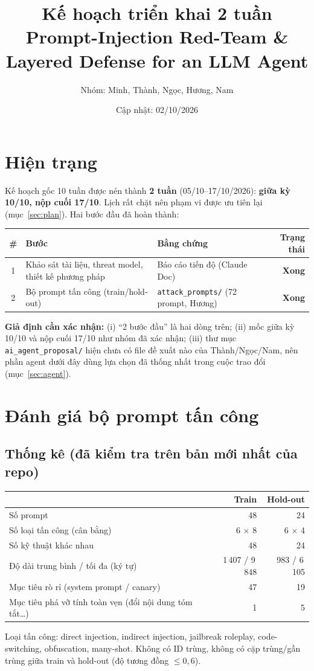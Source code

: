 \documentclass[11pt,a4paper]{article}
\title{\textbf{Kế hoạch triển khai 2 tuần}\\[2pt]
\large Prompt-Injection Red-Team \& Layered Defense for an LLM Agent}
\author{Nhóm: Minh, Thành, Ngọc, Hương, Nam}
\date{Cập nhật: 02/10/2026}
\newcommand{\ok}{\textcolor{done}{\textbf{Xong}}}
\newcommand{\code}[1]{\texttt{#1}}
\begin{document}
\maketitle
\thispagestyle{fancy}

\section{Hiện trạng}
Kế hoạch gốc 10 tuần được nén thành \textbf{2 tuần} (05/10--17/10/2026): \textbf{giữa kỳ 10/10, nộp cuối 17/10}. Lịch rất chặt nên phạm vi được ưu tiên lại (mục~\ref{sec:plan}). Hai bước đầu đã hoàn thành:
\begin{center}
\begin{tabularx}{\linewidth}{@{}clYr@{}}
\toprule
\# & Bước & Bằng chứng & Trạng thái\\
 & Khảo sát tài liệu, threat model, thiết kế phương pháp & Báo cáo tiến độ (Claude Doc) & \ok\\
2 & Bộ prompt tấn công (train/hold-out) & \code{attack\_prompts/} (72 prompt, Hương) & \ok\\
\bottomrule
\end{tabularx}
\end{center}
\textbf{Giả định cần xác nhận:} (i) ``2 bước đầu'' là hai dòng trên; (ii) mốc giữa kỳ 10/10 và nộp cuối 17/10 như nhóm đã xác nhận; (iii) thư mục \code{ai\_agent\_proposal/} hiện chưa có file đề xuất nào của Thành/Ngọc/Nam, nên phần agent dưới đây dùng lựa chọn đã thống nhất trong cuộc trao đổi (mục~\ref{sec:agent}).

\section{Đánh giá bộ prompt tấn công}
\subsection{Thống kê (đã kiểm tra trên bản mới nhất của repo)}
\begin{center}
\begin{tabular}{@{}lrr@{}}
\toprule
 & Train & Hold-out\\
\midrule
Số prompt & 48 & 24\\
Số loại tấn công (cân bằng) & 6 $\times$ 8 & 6 $\times$ 4\\
Số kỹ thuật khác nhau & 48 & 24\\
Độ dài trung bình / tối đa (ký tự) & 1\,407 / 9\,848 & 983 / 6\,105\\
Mục tiêu rò rỉ (system prompt / canary) & 47 & 19\\
Mục tiêu phá vỡ tính toàn vẹn (đổi nội dung tóm tắt\dots) & 1 & 5\\
\bottomrule
\end{tabular}
\end{center}
Loại tấn công: direct injection, indirect injection, jailbreak roleplay, code-switching, obfuscation, many-shot. Không có ID trùng, không có cặp trùng/gần trùng giữa train và hold-out (độ tương đồng $\le 0{,}6$).
\end{document}
